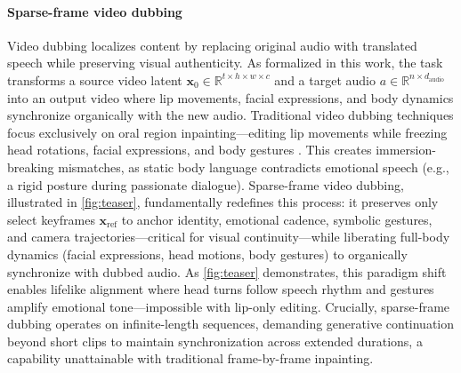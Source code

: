 \paragraph{Sparse-frame video dubbing}
Video dubbing localizes content by replacing original audio with translated speech while preserving visual authenticity. As formalized in this work, the task transforms a source video latent $\boldsymbol{x}_0 \in \mathbb{R}^{t \times h \times w \times c}$ and a target audio $a \in \mathbb{R}^{n \times d_{\mathrm{audio }}}$ into an output video where lip movements, facial expressions, and body dynamics synchronize organically with the new audio.
Traditional video dubbing techniques focus exclusively on oral region inpainting—editing lip movements while freezing head rotations, facial expressions, and body gestures \cite{li2024latentsync}. This creates immersion-breaking mismatches, as static body language contradicts emotional speech (e.g., a rigid posture during passionate dialogue). Sparse-frame video dubbing, illustrated in \cref{fig:teaser}, fundamentally redefines this process: it preserves only select keyframes $\boldsymbol{x}_{\mathrm{ref}}$ to anchor identity, emotional cadence, symbolic gestures, and camera trajectories—critical for visual continuity—while liberating full-body dynamics (facial expressions, head motions, body gestures) to organically synchronize with dubbed audio. As \cref{fig:teaser} demonstrates, this paradigm shift enables lifelike alignment where head turns follow speech rhythm and gestures amplify emotional tone—impossible with lip-only editing. Crucially, sparse-frame dubbing operates on infinite-length sequences, demanding generative continuation beyond short clips to maintain synchronization across extended durations, a capability unattainable with traditional frame-by-frame inpainting.


